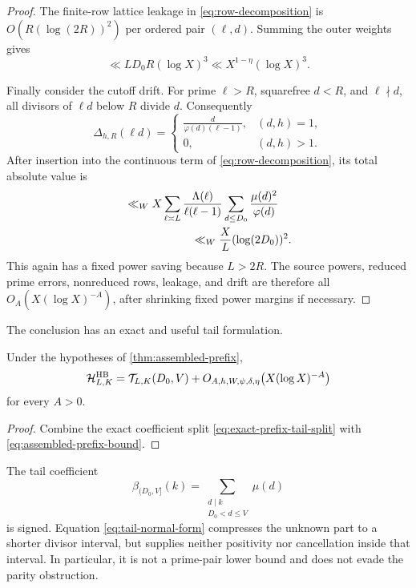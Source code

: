 \begin{proof}
The finite-row lattice leakage in \eqref{eq:row-decomposition} is
$O(R(\log(2R))^2)$ per ordered pair $(\ell,d)$.  Summing the outer
weights gives
\begin{equation}
 \ll LD_0R(\log X)^3
 \ll X^{1-\eta}(\log X)^3.
 \label{eq:assembled-leakage}
\end{equation}

Finally consider the cutoff drift.  For prime $\ell>R$, squarefree
$d<R$, and $\ell\nmid d$, all divisors of $\ell d$ below $R$ divide
$d$.  Consequently
\begin{equation}
 \Delta_{h,R}(\ell d)=
 \begin{cases}
 \displaystyle\frac{d}{\varphi(d)(\ell-1)},&(d,h)=1,\\[0.7em]
 0,&(d,h)>1.
 \end{cases}
 \label{eq:assembled-drift-formula}
\end{equation}
After insertion into the continuous term of
\eqref{eq:row-decomposition}, its total absolute value is
\begin{align}
 &\ll_W X
 \sum_{\ell\asymp L}
 \frac{\Lambda(\ell)}{\ell(\ell-1)}
 \sum_{d\le D_0}\frac{\mu(d)^2}{\varphi(d)}
 \notag\\
 &\hspace{6em}\ll_W \frac XL(\log(2D_0))^2.
 \label{eq:assembled-drift-total}
\end{align}
This again has a fixed power saving because $L>2R$.  The source powers,
reduced prime errors, nonreduced rows, leakage, and drift are therefore
all $O_A(X(\log X)^{-A})$, after shrinking fixed power margins if
necessary.
\end{proof}

The conclusion has an exact and useful tail formulation.

\begin{corollary}
\label{cor:tail-normal-form}
Under the hypotheses of \cref{thm:assembled-prefix},
\begin{equation}
 \mathcal H^{\mathrm{HB}}_{L,K}
 =\mathcal T_{L,K}(D_0,V)
 +O_{A,h,W,\psi,\delta,\eta}
   \bigl(X(\log X)^{-A}\bigr)
 \label{eq:tail-normal-form}
\end{equation}
for every $A>0$.
\end{corollary}

\begin{proof}
Combine the exact coefficient split
\eqref{eq:exact-prefix-tail-split} with
\eqref{eq:assembled-prefix-bound}.
\end{proof}

\begin{remark}
The tail coefficient
\[
 \beta_{(D_0,V]}(k)
 =\sum_{\substack{d\mid k\\D_0<d\le V}}\mu(d)
\]
is signed.  Equation \eqref{eq:tail-normal-form} compresses the unknown
part to a shorter divisor interval, but supplies neither positivity nor
cancellation inside that interval.  In particular, it is not a
prime-pair lower bound and does not evade the parity obstruction.
\end{remark}
